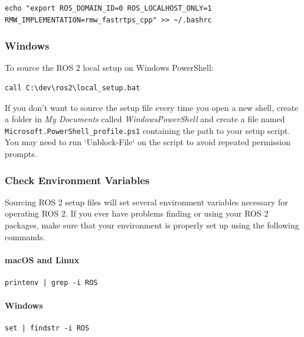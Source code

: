 
\begin{verbatim}
echo "export ROS_DOMAIN_ID=0 ROS_LOCALHOST_ONLY=1 RMW_IMPLEMENTATION=rmw_fastrtps_cpp" >> ~/.bashrc
\end{verbatim}

\subsubsection{Windows}

To source the ROS 2 local setup on Windows PowerShell:

\begin{verbatim}
call C:\dev\ros2\local_setup.bat
\end{verbatim}

If you don't want to source the setup file every time you open a new shell, create a folder in 
\textit{My Documents} called \textit{WindowsPowerShell} and create a file named \texttt{Microsoft.PowerShell\_profile.ps1} containing the path to your setup script. You may need to run `Unblock-File` on the script to avoid repeated permission prompts.


\subsubsection{Check Environment Variables}

Sourcing ROS 2 setup files will set several environment variables necessary for operating ROS 2. If you ever have problems finding or using your ROS 2 packages, make sure that your environment is properly set up using the following commands.

\paragraph{macOS and Linux}
\begin{verbatim}
printenv | grep -i ROS
\end{verbatim}

\paragraph{Windows}
\begin{verbatim}
set | findstr -i ROS
\end{verbatim}

